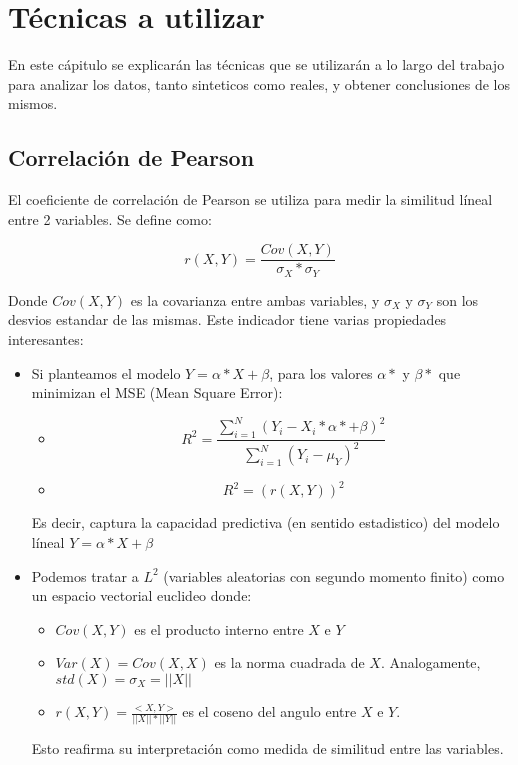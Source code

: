 \chapter{Técnicas a utilizar} \label{chapter:tecnicas_a_utilizar}

En este cápitulo se explicarán las técnicas que se utilizarán a lo largo del trabajo para analizar los datos, tanto sinteticos como reales, y obtener conclusiones de los mismos.

\section{Correlación de Pearson}

El coeficiente de correlación de Pearson se utiliza para medir la similitud líneal entre 2 variables. Se define como:

$$
    r(X,Y) = \frac{Cov(X,Y)}{\sigma_X * \sigma_Y}
$$

Donde $Cov(X,Y)$ es la covarianza entre ambas variables, y $\sigma_X$ y $\sigma_Y$ son los desvios estandar de las mismas. Este indicador tiene varias propiedades interesantes:

\begin{itemize}
    \item Si planteamos el modelo $Y = \alpha * X + \beta$, para los valores $\alpha*$ y $\beta*$ que minimizan el MSE (Mean Square Error):
        \begin{itemize}
            \item $$ R^2 = \frac{\sum_{i=1}^{N} (Y_i - X_i * \alpha* + \beta)^2} {\sum_{i=1}^{N} (Y_i - \mu_Y)^2} $$
            \item $$ R^2 = (r(X,Y))^2 $$
        \end{itemize}

        Es decir, captura la capacidad predictiva (en sentido estadistico) del modelo líneal $Y = \alpha * X + \beta$
    \item Podemos tratar a $L^2$ (variables aleatorias con segundo momento finito) como un espacio vectorial euclideo donde:
        \begin{itemize}
            \item $Cov(X,Y)$ es el producto interno entre $X$ e $Y$
            \item $Var(X) = Cov(X,X)$ es la norma cuadrada de $X$. Analogamente, $std(X) = \sigma_X = ||X||$
            \item $ r(X,Y) = \frac{<X,Y>}{||X|| * ||Y||} $ es el coseno del angulo entre $X$ e $Y$.
        \end{itemize}

        Esto reafirma su interpretación como medida de similitud entre las variables.
\end{itemize}


